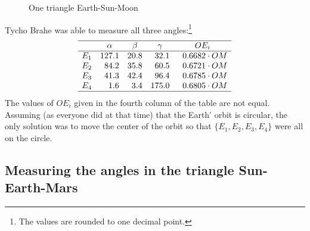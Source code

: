 \begin{figure}[t]
\begin{center}
\caption{One triangle Earth-Sun-Moon}\label{f.kepler-one-triangle}
\end{center}
\end{figure}


Tycho Brahe was able to measure all three angles:\footnote{The values are rounded to one decimal point.}
\[
\begin{array}{rrrrr}
\hline
& \multicolumn{1}{c}{\alpha} & \multicolumn{1}{c}{\beta} &
  \multicolumn{1}{c}{\gamma} & \multicolumn{1}{c}{OE_i} \\\hline
E_1 & 127.1 & 20.8  & 32.1 & \;\; 0.6682\cdot OM\\
E_2 & 84.2 & 35.8 & 60.5 & \;\;0.6721\cdot OM\\
E_3 & 41.3 & 42.4 &96.4 & \;\;0.6785\cdot OM\\
E_4 & 1.6& 3.4& 175.0 & \;\;0.6805\cdot OM\\
\hline
\end{array}
\]
The values of $OE_i$ given in the fourth column of the table are not equal. Assuming (as everyone did at that time) that the Earth' orbit is circular, the only solution was to move the center of the orbit so that $\{E_1,E_2,E_3,E_4\}$ were all on the circle.

\subsection{Measuring the angles in the triangle Sun-Earth-Mars}

